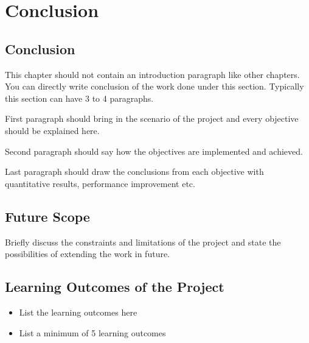 \chapter{Conclusion}

\section{Conclusion}
This chapter should not contain an introduction paragraph like other chapters. You can directly write conclusion of the work done under this section. Typically this section can have 3 to 4 paragraphs. 

First paragraph should bring in the scenario of the project and every objective should be explained here.

Second paragraph should say how the objectives are implemented and achieved.

Last paragraph should draw the conclusions from each objective with quantitative results, performance improvement etc. 

\section{Future Scope}
Briefly discuss the constraints and limitations of the project and state the possibilities of extending the work in future.
\section{Learning Outcomes of the Project}
\begin{itemize}
\item List the learning outcomes here
\item List a minimum of 5 learning outcomes
\end{itemize}

